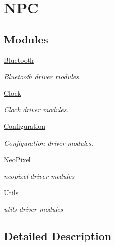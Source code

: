 \hypertarget{group___n_p_c}{}\section{N\+PC}
\label{group___n_p_c}
\subsection*{Modules}
\begin{DoxyCompactItemize}
\item 
\hyperlink{group___bluetooth}{Bluetooth}
\begin{DoxyCompactList}\small\item\em Bluetooth driver modules. \end{DoxyCompactList}\item 
\hyperlink{group___clock}{Clock}
\begin{DoxyCompactList}\small\item\em Clock driver modules. \end{DoxyCompactList}\item 
\hyperlink{group___configuration}{Configuration}
\begin{DoxyCompactList}\small\item\em Configuration driver modules. \end{DoxyCompactList}\item 
\hyperlink{group___neo_pixel}{Neo\+Pixel}
\begin{DoxyCompactList}\small\item\em neopixel driver modules \end{DoxyCompactList}\item 
\hyperlink{group___utils}{Utils}
\begin{DoxyCompactList}\small\item\em utils driver modules \end{DoxyCompactList}\end{DoxyCompactItemize}


\subsection{Detailed Description}
